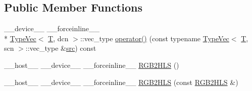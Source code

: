 \subsection*{Public Member Functions}
\begin{DoxyCompactItemize}
\item 
\-\_\-\-\_\-device\-\_\-\-\_\- \-\_\-\-\_\-forceinline\-\_\-\-\_\- \\*
\hyperlink{structcv_1_1gpu_1_1device_1_1TypeVec}{Type\-Vec}$<$ \hyperlink{calib3d_8hpp_a3efb9551a871ddd0463079a808916717}{T}, dcn $>$\-::vec\-\_\-type \hyperlink{structcv_1_1gpu_1_1device_1_1color__detail_1_1RGB2HLS_a79585428fb169c4534340ec75394a97c}{operator()} (const typename \hyperlink{structcv_1_1gpu_1_1device_1_1TypeVec}{Type\-Vec}$<$ \hyperlink{calib3d_8hpp_a3efb9551a871ddd0463079a808916717}{T}, scn $>$\-::vec\-\_\-type \&\hyperlink{legacy_8hpp_a371cd109b74033bc4366f584edd3dacc}{src}) const 
\item 
\-\_\-\-\_\-host\-\_\-\-\_\- \-\_\-\-\_\-device\-\_\-\-\_\- \-\_\-\-\_\-forceinline\-\_\-\-\_\- \hyperlink{structcv_1_1gpu_1_1device_1_1color__detail_1_1RGB2HLS_a72f00a5166336383b58048153ead3c89}{R\-G\-B2\-H\-L\-S} ()
\item 
\-\_\-\-\_\-host\-\_\-\-\_\- \-\_\-\-\_\-device\-\_\-\-\_\- \-\_\-\-\_\-forceinline\-\_\-\-\_\- \hyperlink{structcv_1_1gpu_1_1device_1_1color__detail_1_1RGB2HLS_a07ed074d52bc3622a0b147da50dd6324}{R\-G\-B2\-H\-L\-S} (const \hyperlink{structcv_1_1gpu_1_1device_1_1color__detail_1_1RGB2HLS}{R\-G\-B2\-H\-L\-S} \&)
\end{DoxyCompactItemize}


